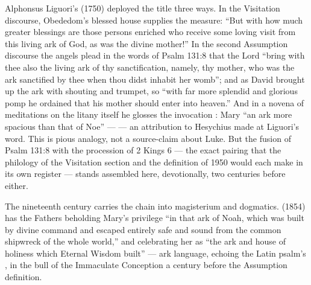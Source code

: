 Alphonsus Liguori's  (1750) deployed the title three
ways. In the Visitation discourse, Obededom's blessed house supplies the
measure: ``But with how much greater blessings are those persons enriched who
receive some loving visit from this living ark of God, as was the divine
mother!'' In the second Assumption discourse the angels plead in the words of
Psalm 131:8 that the Lord ``bring with thee also the living ark of thy
sanctification, namely, thy mother, who was the ark sanctified by thee when
thou didst inhabit her womb''; and as David brought up the ark with shouting
and trumpet, so ``with far more splendid and glorious pomp he ordained that
his mother should enter into heaven.'' And in a novena of meditations on the
litany itself he glosses the invocation : Mary ``an ark
more spacious than that of Noe'' ---  --- an
attribution to Hesychius made at Liguori's word. This is pious analogy, not
a source-claim about Luke. But the fusion of Psalm 131:8 with the procession
of 2 Kings 6 --- the exact pairing that the philology of the Visitation
section and the definition of 1950 would each make in its own register ---
stands assembled here, devotionally, two centuries before
either.

The nineteenth century carries the chain into magisterium and dogmatics.
 (1854) has the Fathers beholding Mary's privilege
``in that ark of Noah, which was built by divine command and escaped entirely
safe and sound from the common shipwreck of the whole world,'' and
celebrating her as ``the ark and house of holiness which Eternal Wisdom
built'' --- ark language, echoing the Latin psalm's , in the bull of the Immaculate Conception a century before
the Assumption definition.

